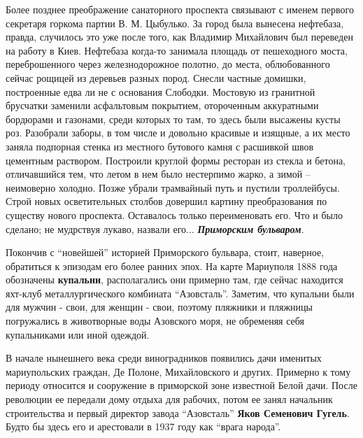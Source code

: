 Более позднее преображение санаторного проспекта связывают с именем первого
секретаря горкома партии В. М. Цыбулько. За город была вынесена нефтебаза,
правда, случилось это уже после того, как Владимир Михайлович был переведен на
работу в Киев. Нефтебаза когда-то занимала площадь от пешеходного моста,
переброшенного через железнодорожное полотно, до места, облюбованного сейчас
рощицей из деревьев разных пород. Снесли частные домишки, построенные едва ли
не с основания Слободки. Мостовую из гранитной брусчатки заменили асфальтовым
покрытием, отороченным аккуратными бордюрами и газонами, среди которых то там,
то здесь были высажены кусты роз. Разобрали заборы, в том числе и довольно
красивые и изящные, а их место заняла подпорная стенка из местного бутового
камня с расшивкой швов цементным раствором. Построили круглой формы ресторан из
стекла и бетона, отличавшийся тем, что летом в нем было нестерпимо жарко, а
зимой – неимоверно холодно. Позже убрали трамвайный путь и пустили троллейбусы.
Строй новых осветительных столбов довершил картину преобразования по существу
нового проспекта. Оставалось только переименовать его. Что и было сделано; не
мудрствуя лукаво, назвали его... \textbf{\em Приморским бульваром}.

Покончив с \enquote{новейшей} историей Приморского бульвара, стоит, наверное,
обратиться к эпизодам его более ранних эпох. На карте Мариуполя 1888 года
обозначены \textbf{купальни}, располагались они примерно там, где сейчас находится
яхт-клуб металлургического комбината \enquote{Азовсталь}. Заметим, что купальни были
для мужчин - свои, для женщин - свои, поэтому пляжники и пляжницы погружались в
животворные воды Азовского моря, не обременяя себя купальниками или иной
одеждой.

В начале нынешнего века среди виноградников появились дачи именитых
мариупольских граждан, Де Полоне, Михайловского и других. Примерно к тому
периоду относится и сооружение в приморской зоне известной Белой дачи. После
революции ее передали дому отдыха для рабочих, потом ее занял начальник
строительства и первый директор завода \enquote{Азовсталь} \textbf{Яков Семенович Гугель}. Будто
бы здесь его и арестовали в 1937 году как \enquote{врага народа}. 


